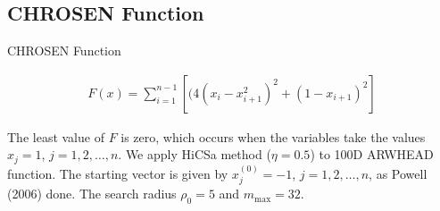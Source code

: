 \documentclass{beamer}
\begin{document}
\subsection{CHROSEN Function}
\begin{frame}{CHROSEN Function}

\footnotesize{
\begin{align*}
	F(x) = \sum_{i=1}^{n-1}[(4(x_i-x_{i+1}^2)^2 + (1-x_{i+1})^2]
\end{align*}

The least value of $F$ is zero, which occurs when the variables take the values
$x_j=1$, $j=1,2,\dots,n$.
We apply HiCSa method ($\eta=0.5$) to 100D ARWHEAD function.
The starting vector is given by $x_j^{(0)}=-1$, $j=1,2,\dots,n$, as
Powell (2006) done. The search radius $\rho_0=5$ and $m_{\max}=32$.
}
%
\begin{figure}[!htbp]
	\centering

\end{figure}
\end{frame}
\end{document}
